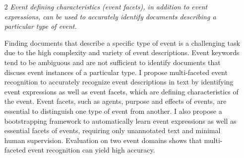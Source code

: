 \begin{enumerate}
    \item[2] {\em{Event defining characteristics (event facets), in addition to event expressions, can be used to accurately identify documents describing 
a particular type of event.}}

Finding documents that describe a specific type of event is a 
challenging task due to the high complexity and variety
of event descriptions. Event keywords tend to be ambiguous and are not sufficient to identify documents that discuss 
event instances of a particular type.
I propose multi-faceted event recognition to accurately recognize event descriptions in
text by identifying event expressions as well as event facets, which are defining characteristics of the event. 
Event facets, such as agents, purpose and effects of events, are essential to distinguish one type of event from another.
I also propose a bootstrapping framework to automatically learn event expressions as
well as essential facets of events, requiring only unannotated text and minimal human supervision.
Evaluation on two event domains shows that multi-faceted event recognition can yield high accuracy.


  \end{enumerate}

  



